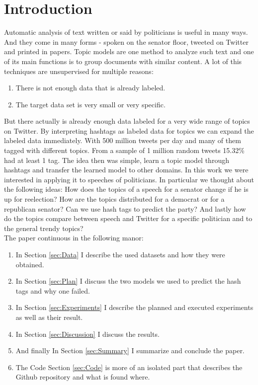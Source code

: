 \documentclass[10pt,conference,compsocconf]{IEEEtran}
\begin{document}
\section{Introduction}
Automatic analysis of text written or said by politicians is useful in many ways. And they come in many forms - spoken on the senator floor, tweeted on Twitter and printed in papers. 
Topic models are one method to analyze such text and one of its main functions is to group documents with similar content. A lot of this techniques are unsupervised for multiple reasons: \begin{enumerate}
	\item There is not enough data that is already labeled. 
	\item The target data set is very small or very specific. 
\end{enumerate} 
But there actually is already enough data labeled for a very wide range of topics on Twitter. By interpreting hashtags as labeled data for topics we can expand the labeled data immediately. With 500 million tweets per day \cite{twitter_stats} and many of them tagged with different topics. From a sample of 1 million random tweets 15.32\% had at least 1 tag. The idea then was simple, learn a topic model through hashtags and transfer the learned model to other domains. In this work we were interested in applying it to speeches of politicians. In particular we thought about the following ideas: How does the topics of a speech for a senator change if he is up for reelection? How are the topics distributed for a democrat or for a republican senator? Can we use hash tags to predict the party? And lastly how do the topics compare between speech and Twitter for a specific politician and to the general trendy topics? \\
The paper continuous in the following manor: 
\begin{enumerate}
	\item In Section \ref{sec:Data} I describe the used datasets and how they were obtained. \\
	\item In Section \ref{sec:Plan} I discuss the two models we used to predict the hash tags and why one failed. \\
	\item In Section \ref{sec:Experiments} I describe the planned and executed experiments as well as their result.\\
	\item In Section \ref{sec:Discussion} I discuss the results.\\
	
	\item And finally In Section \ref{sec:Summary} I summarize and conclude the paper. \\
	\item The Code Section \ref{sec:Code} is more of an isolated part that describes the Github repository and what is found where. 
\end{enumerate}
\end{document}
